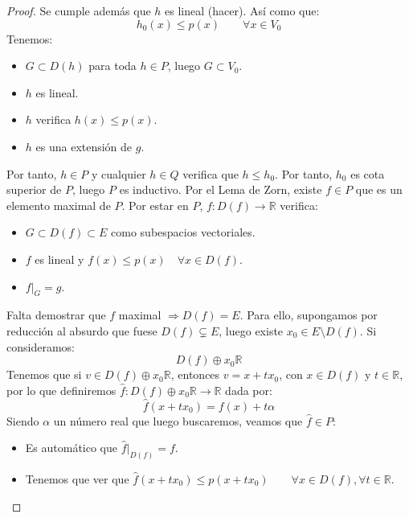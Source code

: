 \begin{teo}
\begin{proof}
        Se cumple además que $h$ es lineal (hacer). %
        Así como que: %
        \begin{equation*}
            h_0(x) \leq p(x) \qquad \forall x\in V_0
        \end{equation*}
        Tenemos:
        \begin{itemize}
            \item $G\subset D(h)$ para toda $h\in P$, luego $G\subset V_0$.
            \item $h$ es lineal.
            \item $h$ verifica $h(x) \leq p(x)$.
            \item $h$ es una extensión de $g$.
        \end{itemize}
        Por tanto, $h\in P$ y cualquier $h\in Q$ verifica que $h\leq h_0$. Por tanto, $h_0$ es cota superior de $P$, luego $P$ es inductivo. Por el Lema de Zorn, existe $f\in P$ que es un elemento maximal de $P$. Por estar en $P$,  $f:D(f)\to \mathbb{R}$ verifica:
        \begin{itemize}
            \item $G\subset D(f)\subset E$ como subespacios vectoriales.
            \item $f$ es lineal y $f(x) \leq p(x) \quad  \forall x\in D(f)$.
            \item $f\big|_G = g$.
        \end{itemize}
        Falta demostrar que $f$ maximal $\Longrightarrow D(f) = E$. Para ello, supongamos por reducción al absurdo que fuese $D(f)\subsetneq E$, luego existe $x_0\in E\setminus D(f)$. Si consideramos:
        \begin{equation*}
            D(f) \oplus x_0\mathbb{R}
        \end{equation*}
        Tenemos que si $v\in D(f)\oplus x_0\mathbb{R}$, entonces $v = x+tx_0$, con $x\in D(f)$ y $t\in \mathbb{R}$, por lo que definiremos $\hat{f}:D(f)\oplus x_0\mathbb{R}\to \mathbb{R}$ dada por:
        \begin{equation*}
            \hat{f}(x+tx_0) = f(x) + t\alpha
        \end{equation*}
        Siendo $\alpha$ un número real que luego buscaremos, veamos que $\hat{f}\in P$:
        \begin{itemize}
            \item Es automático que $\hat{f}\big|_{D(f)} = f$.
            \item Tenemos que ver que $\hat{f}(x+tx_0) \leq p(x+tx_0)\qquad \forall x\in D(f), \forall t\in \mathbb{R}$.


\end{itemize}
\end{proof}
\end{teo}
